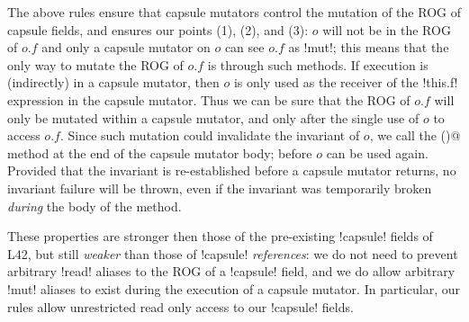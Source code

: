 	
\noindent The above rules ensure that capsule mutators control the mutation of the ROG of capsule fields, and 
 ensures our points (1), (2), and (3):
$o$ will not be in the ROG of $o.f$ and
only a capsule mutator on $o$ can see $o.f$ as \Q!mut!; this means that the only way to mutate the ROG of $o.f$ is through such methods. 
If execution is (indirectly) in a capsule mutator, then $o$ is only used as the receiver of the \Q!this.f! expression in the capsule mutator.
Thus we can be sure that the ROG of $o.f$ will only be mutated within a capsule mutator, and only after the single use of $o$ to access $o.f$.
Since such mutation could invalidate the invariant of $o$, we call the \Q@invariant()@ method at the end of the capsule mutator body; before $o$ can be used again. Provided that the invariant is re-established before a capsule mutator returns, no invariant failure will be thrown, even if the invariant was temporarily broken \emph{during} the body of the method.


These properties are stronger then those of the pre-existing \Q!capsule! fields of L42, but still
\emph{weaker} than those of \Q!capsule! \emph{references}: we do not need to prevent arbitrary \Q!read! aliases to the ROG of a \Q!capsule! field, and we do allow arbitrary \Q!mut! aliases  to exist during the execution of a capsule mutator. In particular, our rules allow unrestricted read only access to our \Q!capsule! fields.



